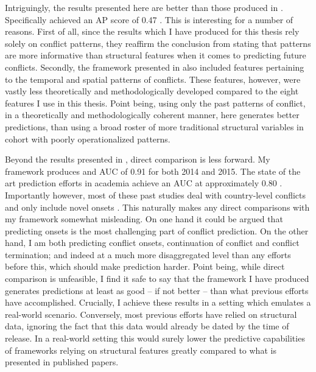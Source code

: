 \documentclass[a4paper]{article}
\begin{document}
Intriguingly, the results presented here are better than those produced in \cite{Maase}. Specifically \cite{Maase} achieved an AP score of 0.47 \cite[14]{Maase}. This is interesting for a number of reasons. First of all, since the results which I have produced for this thesis rely solely on conflict patterns, they reaffirm the conclusion from \cite{Maase} stating that patterns are more informative than structural features when it comes to predicting future conflicts. Secondly, the framework presented in \cite{Maase} also included features pertaining to the temporal and spatial patterns of conflicts. These features, however, were vastly less theoretically and methodologically developed compared to the eight features I use in this thesis. Point being, using only the past patterns of conflict, in a theoretically and methodologically coherent manner, here generates better predictions, than using a broad roster of more traditional structural variables in cohort with poorly operationalized patterns.\par


Beyond the results presented in \cite{Maase}, direct comparison is less forward. My framework produces and AUC of 0.91 for both 2014 and 2015. The state of the art prediction efforts in academia achieve an AUC at approximately 0.80 \citep[14]{chadefaux2017conflict}. Importantly however, most of these past studies deal with country-level conflicts and only include novel onsets \citep[14]{chadefaux2017conflict}. This naturally makes any direct comparisons with my framework somewhat misleading. On one hand it could be argued that predicting onsets is the most challenging part of conflict prediction. On the other hand, I am both predicting conflict onsets, continuation of conflict and conflict termination; and indeed at a much more disaggregated level than any efforts before this, which should make prediction harder. Point being, while direct comparison is unfeasible, I find it safe to say that the framework I have produced generates predictions at least as good -- if not better -- than what previous efforts have accomplished. Crucially, I achieve these results in a setting which emulates a real-world scenario. Conversely, most previous efforts have relied on structural data, ignoring the fact that this data would already be dated by the time of release. In a real-world setting this would surely lower the predictive capabilities of frameworks relying on structural features greatly compared to what is presented in published papers.\par
\end{document}
